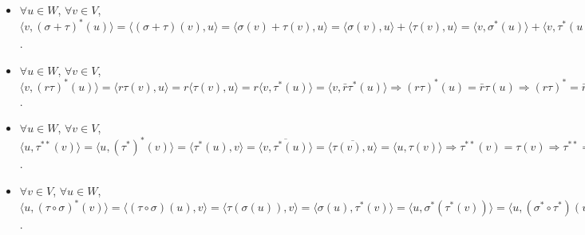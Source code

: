 \documentclass{note}
\begin{document}
\begin{pf}
    \begin{itemize}
        \item[(1)] $\forall u\in W$, $\forall v\in V$, $\langle v,(\sigma+\tau)^*(u)\rangle=\langle(\sigma+\tau)(v),u\rangle=\langle\sigma(v)+\tau(v),u\rangle=\langle\sigma(v),u\rangle+\langle\tau(v),u\rangle=\langle v,\sigma^*(u)\rangle+\langle v,\tau^*(u)\rangle=\langle v,\sigma^*(u)+\tau^*(u)\rangle=\langle v,(\sigma^*+\tau^*)(u)\rangle\Longrightarrow(\sigma+\tau)^*(u)=(\sigma^*+\tau^*)(u)\Longrightarrow(\sigma+\tau)^*=\sigma^*+\tau^*$.
        \item[(2)] $\forall u\in W$, $\forall v\in V$, $\langle v,(r\tau)^*(u)\rangle=\langle r\tau(v),u\rangle=r\langle\tau(v),u\rangle=r\langle v,\tau^*(u)\rangle=\langle v,\bar{r}\tau^*(u)\rangle\Longrightarrow(r\tau)^*(u)=\bar{r}\tau(u)\Longrightarrow(r\tau)^*=\bar{r}\tau^*$.
        \item[(3)] $\forall u\in W$, $\forall v\in V$, $\langle u,\tau^{**}(v)\rangle=\langle u,(\tau^*)^*(v)\rangle=\langle\tau^*(u),v\rangle=\overline{\langle v,\tau^*(u)\rangle}=\overline{\langle\tau(v),u\rangle}=\langle u,\tau(v)\rangle\Longrightarrow\tau^{**}(v)=\tau(v)\Longrightarrow\tau^{**}=\tau$.
        \item[(4)] $\forall v\in V$, $\forall u\in W$, $\langle u,(\tau\circ\sigma)^*(v)\rangle=\langle(\tau\circ\sigma)(u),v\rangle=\langle\tau(\sigma(u)),v\rangle=\langle\sigma(u),\tau^*(v)\rangle=\langle u,\sigma^*(\tau^*(v))\rangle=\langle u,(\sigma^*\circ\tau^*)(v)\rangle\Longrightarrow(\tau\circ\sigma)^*(v)=(\sigma^*\circ\tau^*)(v)\Longrightarrow(\tau\circ\sigma)^*=\sigma^*\circ\tau^*$.
        \begin{center}
\end{center}
\end{itemize}
\end{pf}
\end{document}
